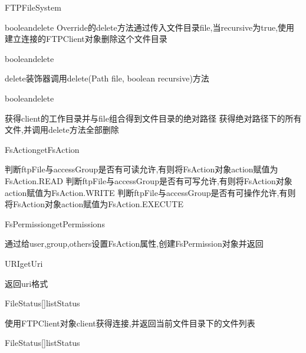\begin{XeClass}{FTPFileSystem}
\begin{XeMethod}{\XePublic}{boolean}{delete}
 Override的delete方法通过传入文件目录file,当recursive为true,使用建立连接的FTPClient对象删除这个文件目录

    \end{XeMethod}

    \begin{XeMethod}{\XePrivate}{boolean}{delete}
         
 delete装饰器调用delete(Path file, boolean recursive)方法

    \end{XeMethod}

    \begin{XeMethod}{\XePrivate}{boolean}{delete}
         
 获得client的工作目录并与file组合得到文件目录的绝对路径
 获得绝对路径下的所有文件,并调用delete方法全部删除

    \end{XeMethod}

    \begin{XeMethod}{\XePrivate}{FsAction}{getFsAction}
         
 判断ftpFile与accessGroup是否有可读允许,有则将FsAction对象action赋值为FsAction.READ
 判断ftpFile与accessGroup是否有可写允许,有则将FsAction对象action赋值为FsAction.WRITE
 判断ftpFile与accessGroup是否有可操作允许,有则将FsAction对象action赋值为FsAction.EXECUTE

    \end{XeMethod}

    \begin{XeMethod}{\XePrivate}{FsPermission}{getPermissions}
         
 通过给user,group,others设置FsAction属性,创建FsPermission对象并返回

    \end{XeMethod}

    \begin{XeMethod}{\XePublic}{URI}{getUri}
         
 返回uri格式

    \end{XeMethod}

    \begin{XeMethod}{\XePublic}{FileStatus[]}{listStatus}
         
 使用FTPClient对象client获得连接,并返回当前文件目录下的文件列表

    \end{XeMethod}

    \begin{XeMethod}{\XePrivate}{FileStatus[]}{listStatus}
         

\end{XeMethod}
\end{XeClass}
